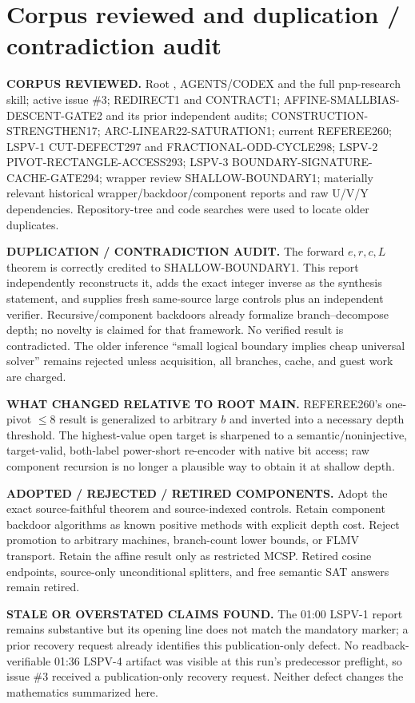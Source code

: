 \documentclass[11pt]{article}
\begin{document}
\section{Corpus reviewed and duplication / contradiction audit}
\textbf{CORPUS REVIEWED.} Root , AGENTS/CODEX and the full pnp-research skill; active issue \#3; REDIRECT1 and CONTRACT1; AFFINE-SMALLBIAS-DESCENT-GATE2 and its prior independent audits; CONSTRUCTION-STRENGTHEN17; ARC-LINEAR22-SATURATION1; current REFEREE260; LSPV-1 CUT-DEFECT297 and FRACTIONAL-ODD-CYCLE298; LSPV-2 PIVOT-RECTANGLE-ACCESS293; LSPV-3 BOUNDARY-SIGNATURE-CACHE-GATE294; wrapper review SHALLOW-BOUNDARY1; materially relevant historical wrapper/backdoor/component reports and raw U/V/Y dependencies.  Repository-tree and code searches were used to locate older duplicates.

\textbf{DUPLICATION / CONTRADICTION AUDIT.} The forward $e,r,c,L$ theorem is correctly credited to SHALLOW-BOUNDARY1.  This report independently reconstructs it, adds the exact integer inverse as the synthesis statement, and supplies fresh same-source large controls plus an independent verifier.  Recursive/component backdoors already formalize branch--decompose depth; no novelty is claimed for that framework.  No verified result is contradicted.  The older inference ``small logical boundary implies cheap universal solver'' remains rejected unless acquisition, all branches, cache, and guest work are charged.

\textbf{WHAT CHANGED RELATIVE TO ROOT MAIN.} REFEREE260's one-pivot $\le8$ result is generalized to arbitrary $b$ and inverted into a necessary depth threshold.  The highest-value open target is sharpened to a semantic/noninjective, target-valid, both-label power-short re-encoder with native bit access; raw component recursion is no longer a plausible way to obtain it at shallow depth.

\textbf{ADOPTED / REJECTED / RETIRED COMPONENTS.} Adopt the exact source-faithful theorem and source-indexed controls.  Retain component backdoor algorithms as known positive methods with explicit depth cost.  Reject promotion to arbitrary machines, branch-count lower bounds, or FLMV transport.  Retain the affine result only as restricted MCSP.  Retired cosine endpoints, source-only unconditional splitters, and free semantic SAT answers remain retired.

\textbf{STALE OR OVERSTATED CLAIMS FOUND.} The 01:00 LSPV-1 report remains substantive but its opening line does not match the mandatory marker; a prior recovery request already identifies this publication-only defect.  No readback-verifiable 01:36 LSPV-4 artifact was visible at this run's predecessor preflight, so issue \#3 received a publication-only recovery request.  Neither defect changes the mathematics summarized here.
\end{document}
